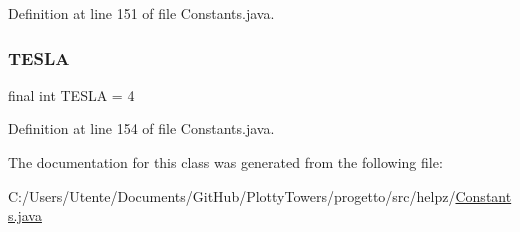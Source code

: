 Definition at line 151 of file Constants.\+java.

\mbox{\label{classhelpz_1_1_constants_1_1_towers_a4d5acad31ff3b2bae0b29f2dcc483e65}} 
\subsubsection{\texorpdfstring{T\+E\+S\+LA}{TESLA}}
{\footnotesize\ttfamily final int T\+E\+S\+LA = 4\hspace{0.3cm}{\ttfamily [static]}}



Definition at line 154 of file Constants.\+java.



The documentation for this class was generated from the following file\+:\begin{DoxyCompactItemize}
\item 
C\+:/\+Users/\+Utente/\+Documents/\+Git\+Hub/\+Plotty\+Towers/progetto/src/helpz/\hyperlink{_constants_8java}{Constants.\+java}\end{DoxyCompactItemize}
